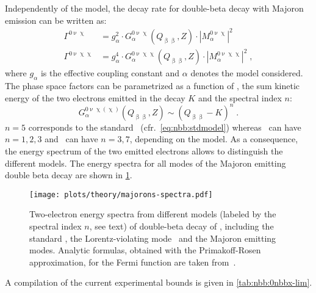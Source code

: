 Independently of the model, the decay rate for double-beta decay with Majoron
emission can be written as:
\begin{align*}
  \Gamma^{0\upnu\upchi}  &= g_\alpha^2 \cdot G_\alpha^{0\upnu\upchi}(Q_{\upbeta\upbeta}, Z)
    \cdot |M_\alpha^{0\upnu\upchi}|^2 \\
  \Gamma^{0\upnu\upchi\upchi} &= g_\alpha^4 \cdot G_\alpha^{0\upnu\upchi\upchi}(Q_{\upbeta\upbeta}, Z)
    \cdot |M_\alpha^{0\upnu\upchi\upchi}|^2 \;,
\end{align*}
where $g_\alpha$ is the effective coupling constant and $\alpha$ denotes the
model considered. The phase space factors can be parametrized as a
function of \qbb, the sum kinetic energy of the two electrons emitted in
the decay $K$ and the spectral index $n$:
\[
  G_\alpha^{0\upnu\upchi(\upchi)}(Q_{\upbeta\upbeta}, Z)
    \sim {(Q_{\upbeta\upbeta} - K)}^n \;.
\]
$n = 5$ corresponds to the standard \nnbb\ (cfr.~\cref{eq:nbb:stdmodel})
whereas \onbbx\ can have $n = 1, 2, 3$ and \onbbxx\ can have $n = 3, 7$,
depending on the model. As a consequence, the energy spectrum of the two
emitted electrons allows to distinguish the different models. The energy
spectra for all modes of the Majoron emitting double beta decay are shown in
\cref{fig:nbb:majorons-spectra}.

\begin{table}
  \centering
  \caption{%
    Compilation of up-to-date calculations of phase-space factors \psfmajo\
    and nuclear matrix elements \nmemajo\ for various Majoron-emitting \onbb\
    modes and isotopes.
  }\label{tab:nbb:0nbbx-psf-nme}
  
\end{table}

\begin{figure}
  \centering
  \texttt{[image: plots/theory/majorons-spectra.pdf]}
  \caption{%
    Two-electron energy spectra from different models (labeled by the spectral
    index $n$, see text) of double-beta decay of \gesix, including the standard
    \nnbb, the Lorentz-violating mode \nnbblv\ and the Majoron emitting
    modes.  Analytic formulas, obtained with the Primakoff-Rosen approximation,
    for the Fermi function are taken from~\cite{Tretyak1995, Tretyak2002}.
  }\label{fig:nbb:majorons-spectra}
\end{figure}

 A compilation of the current experimental bounds is given in
\cref{tab:nbb:0nbbx-lim}.

